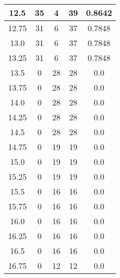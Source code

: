 \documentclass[letterpaper, 12pt]{article}
\begin{document}
\begin{longtable}{|c|c|c|c|c|}
12.5 & 35 & 4 & 39 & 0.8642 \\
\hline
12.75 & 31 & 6 & 37 & 0.7848 \\
\hline
13.0 & 31 & 6 & 37 & 0.7848 \\
\hline
13.25 & 31 & 6 & 37 & 0.7848 \\
\hline
13.5 & 0 & 28 & 28 & 0.0 \\
\hline
13.75 & 0 & 28 & 28 & 0.0 \\
\hline
14.0 & 0 & 28 & 28 & 0.0 \\
\hline
14.25 & 0 & 28 & 28 & 0.0 \\
\hline
14.5 & 0 & 28 & 28 & 0.0 \\
\hline
14.75 & 0 & 19 & 19 & 0.0 \\
\hline
15.0 & 0 & 19 & 19 & 0.0 \\
\hline
15.25 & 0 & 19 & 19 & 0.0 \\
\hline
15.5 & 0 & 16 & 16 & 0.0 \\
\hline
15.75 & 0 & 16 & 16 & 0.0 \\
\hline
16.0 & 0 & 16 & 16 & 0.0 \\
\hline
16.25 & 0 & 16 & 16 & 0.0 \\
\hline
16.5 & 0 & 16 & 16 & 0.0 \\
\hline
16.75 & 0 & 12 & 12 & 0.0 \\
\hline
\end{longtable}
\end{document}
